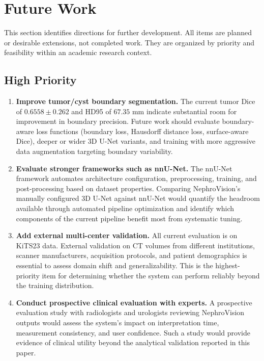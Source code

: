 \section{Future Work}

This section identifies directions for further development. All items are planned or desirable extensions, not completed work. They are organized by priority and feasibility within an academic research context.

\subsection{High Priority}

\begin{enumerate}
    \item \textbf{Improve tumor/cyst boundary segmentation.} The current tumor Dice of $0.6558 \pm 0.262$ and HD95 of $67.35$ mm indicate substantial room for improvement in boundary precision. Future work should evaluate boundary-aware loss functions (boundary loss, Hausdorff distance loss, surface-aware Dice), deeper or wider 3D U-Net variants, and training with more aggressive data augmentation targeting boundary variability.
    
    \item \textbf{Evaluate stronger frameworks such as nnU-Net.} The nnU-Net framework \cite{nnunet} automates architecture configuration, preprocessing, training, and post-processing based on dataset properties. Comparing NephroVision's manually configured 3D U-Net against nnU-Net would quantify the headroom available through automated pipeline optimization and identify which components of the current pipeline benefit most from systematic tuning.
    
    \item \textbf{Add external multi-center validation.} All current evaluation is on KiTS23 data. External validation on CT volumes from different institutions, scanner manufacturers, acquisition protocols, and patient demographics is essential to assess domain shift and generalizability. This is the highest-priority item for determining whether the system can perform reliably beyond the training distribution.
    
    \item \textbf{Conduct prospective clinical evaluation with experts.} A prospective evaluation study with radiologists and urologists reviewing NephroVision outputs would assess the system's impact on interpretation time, measurement consistency, and user confidence. Such a study would provide evidence of clinical utility beyond the analytical validation reported in this paper.
\end{enumerate}

